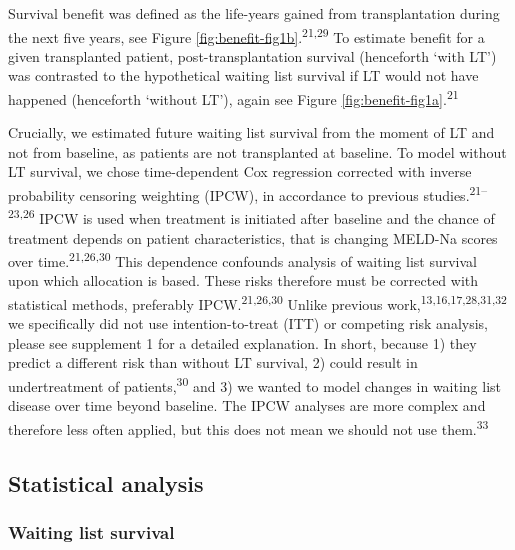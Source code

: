 \documentclass[11pt,english,]{book} %
\begin{document}
Survival benefit was defined as the life-years gained from transplantation during the next five years, see Figure \ref{fig:benefit-fig1b}.\textsuperscript{21,29} To estimate benefit for a given transplanted patient, post-transplantation survival (henceforth `with LT') was contrasted to the hypothetical waiting list survival if LT would not have happened (henceforth `without LT'), again see Figure \ref{fig:benefit-fig1a}.\textsuperscript{21}

Crucially, we estimated future waiting list survival from the moment of LT and not from baseline, as patients are not transplanted at baseline. To model without LT survival, we chose time-dependent Cox regression corrected with inverse probability censoring weighting (IPCW), in accordance to previous studies.\textsuperscript{21--23,26} IPCW is used when treatment is initiated after baseline and the chance of treatment depends on patient characteristics, that is changing MELD-Na scores over time.\textsuperscript{21,26,30} This dependence confounds analysis of waiting list survival upon which allocation is based. These risks therefore must be corrected with statistical methods, preferably IPCW.\textsuperscript{21,26,30} Unlike previous work,\textsuperscript{13,16,17,28,31,32} we specifically did not use intention-to-treat (ITT) or competing risk analysis, please see supplement 1 for a detailed explanation. In short, because 1) they predict a different risk than without LT survival, 2) could result in undertreatment of patients,\textsuperscript{30} and 3) we wanted to model changes in waiting list disease over time beyond baseline. The IPCW analyses are more complex and therefore less often applied, but this does not mean we should not use them.\textsuperscript{33}

\hypertarget{statistical-analysis-2}{%
\subsection*{Statistical analysis}\label{statistical-analysis-2}}

\hypertarget{waiting-list-survival}{%
\subsubsection*{Waiting list survival}\label{waiting-list-survival}}
\end{document}

